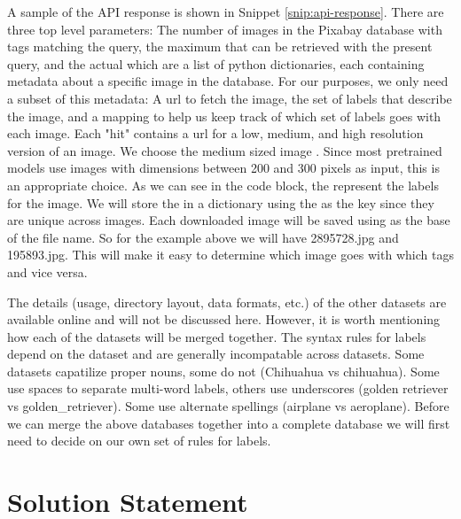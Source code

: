 \documentclass[10pt, a4paper, twocolumn]{article} %
\begin{document}
A sample of the API response is shown in Snippet \ref{snip:api-response}.  There are three top level parameters: The  number of images in the Pixabay database with tags matching the query, the maximum  that can be retrieved with the present query, and the actual  which are a list of python dictionaries, each containing metadata about a specific image in the database.  For our purposes, we only need a subset of this metadata:  A url to fetch the image, the set of labels that describe the image, and a mapping to help us keep track of which set of labels goes with each image.  Each "hit" contains a url for a low, medium, and high resolution version of an image. We choose the medium sized image . Since most pretrained models use images with dimensions between 200 and 300 pixels as input, this is an appropriate choice. As we can see in the code block, the  represent the labels for the image.  We will store the  in a dictionary using the  as the key since they are unique across images. Each downloaded image will be saved using  as the base of the file name.  So for the example above we will have 2895728.jpg and 195893.jpg.  This will make it easy to determine which image goes with which tags and vice versa.

The details (usage, directory layout, data formats, etc.) of the other datasets are available online and will not be discussed here.  However, it is worth mentioning how each of the datasets will be merged together. The syntax rules for labels depend on the dataset and are generally incompatable across datasets.  Some datasets capatilize proper nouns, some do not (Chihuahua vs chihuahua). Some use spaces to separate multi-word labels, others use underscores (golden retriever vs golden\_retriever). Some use alternate spellings (airplane vs aeroplane).  Before we can merge the above databases together into a complete database we will first need to decide on our own set of rules for labels.

\section{Solution Statement} %
\end{document}
